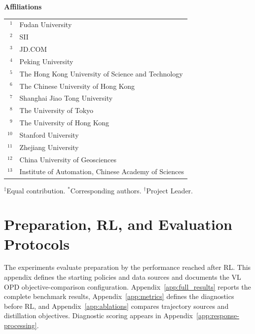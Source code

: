 \documentclass[]{jingdong}
\theoremstyle{plain}
\theoremstyle{definition}
\theoremstyle{remark}
\begin{document}
\vspace{1em}
\textbf{Affiliations}\\[0.5em]
\begin{tabular}{@{}rl@{}}
$^{1}$ & Fudan University \\
$^{2}$ & SII \\
$^{3}$ & JD.COM \\
$^{4}$ & Peking University \\
$^{5}$ & The Hong Kong University of Science and Technology \\
$^{6}$ & The Chinese University of Hong Kong \\
$^{7}$ & Shanghai Jiao Tong University \\
$^{8}$ & The University of Tokyo \\
$^{9}$ & The University of Hong Kong \\
$^{10}$ & Stanford University \\
$^{11}$ & Zhejiang University \\
$^{12}$ & China University of Geosciences \\
$^{13}$ & Institute of Automation, Chinese Academy of Sciences
\end{tabular}

\vspace{1em}
$^{\ddagger}$Equal contribution. \quad
$^{*}$Corresponding authors. \quad
$^{\dagger}$Project Leader.


\clearpage



\appendix
\clearpage
\begingroup
\raggedbottom
\setlength{\floatsep}{10pt plus 2pt minus 2pt}
\setlength{\textfloatsep}{12pt plus 2pt minus 2pt}
\setlength{\intextsep}{10pt plus 2pt minus 2pt}
\section{Preparation, RL, and Evaluation Protocols}
\label{app:experimental-details}

The experiments evaluate preparation by the performance reached after RL. This appendix defines the starting policies and data sources and documents the VL OPD objective-comparison configuration. Appendix~\ref{app:full_results} reports the complete benchmark results, Appendix~\ref{app:metrics} defines the diagnostics before RL, and Appendix~\ref{app:ablations} compares trajectory sources and distillation objectives. Diagnostic scoring appears in Appendix~\ref{app:response-processing}.
\end{document}
